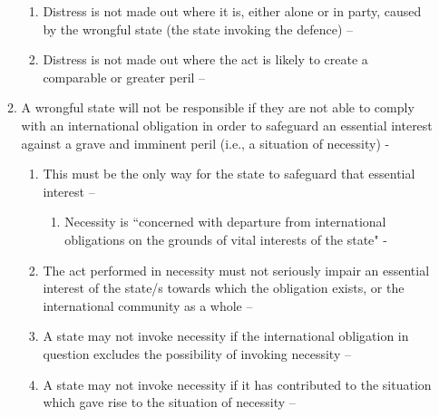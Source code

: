 \begin{enumerate}
\begin{enumerate}
\begin{enumerate}
            \item Distress is not made out where it is, either alone or in party, caused by the wrongful state (the state invoking the defence) -- 
            \item Distress is not made out where the act is likely to create a comparable or greater peril -- 
        \end{enumerate}
        \item A wrongful state will not be responsible if they are not able to comply with an international obligation in order to safeguard an essential interest against a grave and imminent peril (i.e., a situation of necessity) -
        \begin{enumerate}
            \item This must be the only way for the state to safeguard that essential interest -- 
            \begin{enumerate}
                \item Necessity is ``concerned with departure from international obligations on the grounds of vital interests of the state" - 
            \end{enumerate}
            \item The act performed in necessity must not seriously impair an essential interest of the state/s towards which the obligation exists, or the international community as a whole -- 
            \item A state may not invoke necessity if the international obligation in question excludes the possibility of invoking necessity -- 
            \item A state may not invoke necessity if it has contributed to the situation which gave rise to the situation of necessity -- 

\end{enumerate}
\end{enumerate}
\end{enumerate}
